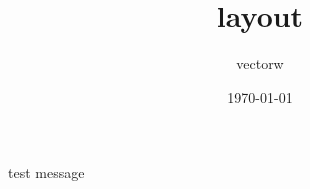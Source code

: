 \documentclass[UTF8]{ctexart}
\author{vectorw}
\date{\today}
\title{layout}
\begin{document}
test message
\end{document}
